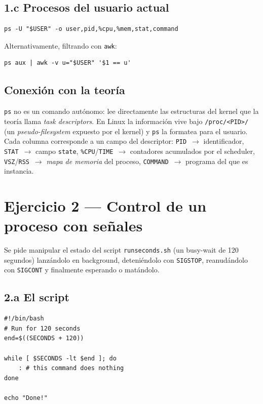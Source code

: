 \documentclass[11pt,a4paper]{article}
\begin{document}
\subsection*{1.c Procesos del usuario actual}

\begin{lstlisting}
ps -U "$USER" -o user,pid,%cpu,%mem,stat,command
\end{lstlisting}

Alternativamente, filtrando con \texttt{awk}:

\begin{lstlisting}
ps aux | awk -v u="$USER" '$1 == u'
\end{lstlisting}

\subsection*{Conexión con la teoría}

\texttt{ps} no es un comando autónomo: lee directamente las estructuras
del kernel que la teoría llama \emph{task descriptors}. En Linux la
información vive bajo \texttt{/proc/<PID>/} (un \emph{pseudo-filesystem}
expuesto por el kernel) y \texttt{ps} la formatea para el usuario. Cada
columna corresponde a un campo del descriptor: \texttt{PID}~$\rightarrow$
identificador, \texttt{STAT}~$\rightarrow$ campo \texttt{state},
\texttt{\%CPU}/\texttt{TIME}~$\rightarrow$ contadores acumulados por el
scheduler, \texttt{VSZ}/\texttt{RSS}~$\rightarrow$ \emph{mapa de memoria}
del proceso, \texttt{COMMAND}~$\rightarrow$ programa del que es instancia.

\section{Ejercicio 2 --- Control de un proceso con señales}

Se pide manipular el estado del script \texttt{runseconds.sh} (un
busy-wait de 120 segundos) lanzándolo en background, deteniéndolo con
\texttt{SIGSTOP}, reanudándolo con \texttt{SIGCONT} y finalmente
esperando o matándolo.

\subsection*{2.a El script}

\begin{lstlisting}[style=shellstyle]
#!/bin/bash
# Run for 120 seconds
end=$((SECONDS + 120))

while [ $SECONDS -lt $end ]; do
    : # this command does nothing
done

echo "Done!"
\end{lstlisting}
\end{document}
